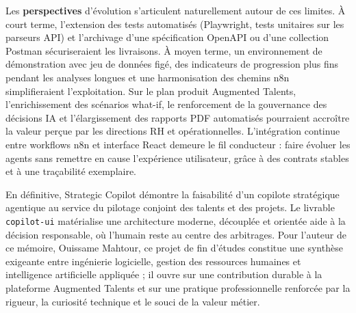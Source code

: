 Les \textbf{perspectives} d'évolution s'articulent naturellement autour de ces limites. À court terme, l'extension des tests automatisés (Playwright, tests unitaires sur les parseurs API) et l'archivage d'une spécification OpenAPI ou d'une collection Postman sécuriseraient les livraisons. À moyen terme, un environnement de démonstration avec jeu de données figé, des indicateurs de progression plus fins pendant les analyses longues et une harmonisation des chemins n8n simplifieraient l'exploitation. Sur le plan produit Augmented Talents, l'enrichissement des scénarios what-if, le renforcement de la gouvernance des décisions IA et l'élargissement des rapports PDF automatisés pourraient accroître la valeur perçue par les directions RH et opérationnelles. L'intégration continue entre workflows n8n et interface React demeure le fil conducteur : faire évoluer les agents sans remettre en cause l'expérience utilisateur, grâce à des contrats stables et à une traçabilité exemplaire.

En définitive, Strategic Copilot démontre la faisabilité d'un copilote stratégique agentique au service du pilotage conjoint des talents et des projets. Le livrable \texttt{copilot-ui} matérialise une architecture moderne, découplée et orientée aide à la décision responsable, où l'humain reste au centre des arbitrages. Pour l'auteur de ce mémoire, Ouissame Mahtour, ce projet de fin d'études constitue une synthèse exigeante entre ingénierie logicielle, gestion des ressources humaines et intelligence artificielle appliquée ; il ouvre sur une contribution durable à la plateforme Augmented Talents et sur une pratique professionnelle renforcée par la rigueur, la curiosité technique et le souci de la valeur métier.
\newpage